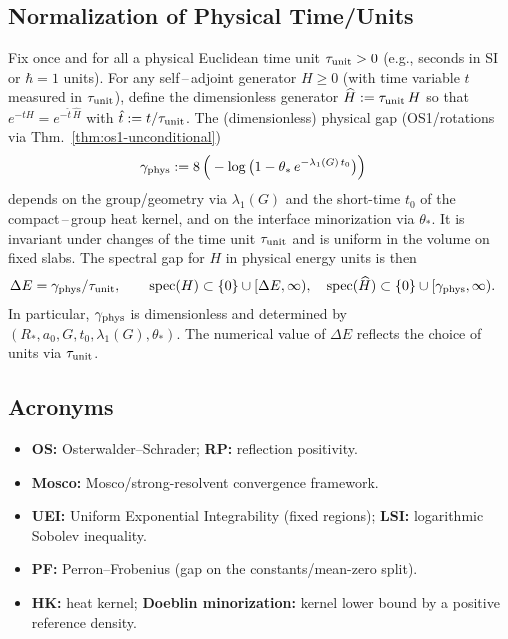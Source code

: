 \documentclass[11pt]{amsart}
\theoremstyle{plain}
\theoremstyle{definition}
\theoremstyle{remark}
\newcommand{\spec}{\operatorname{spec}}
\begin{document}
\subsection*{Normalization of Physical Time/Units}
Fix once and for all a physical Euclidean time unit $\tau_{\rm unit}>0$ (e.g., seconds in SI or $\hbar=1$ units). For any self\,–\,adjoint generator $H\ge 0$ (with time variable $t$ measured in $\tau_{\rm unit}$), define the dimensionless generator $\widehat H:=\tau_{\rm unit}\,H$ so that $e^{-t H}=e^{-\hat t\,\widehat H}$ with $\hat t:=t/\tau_{\rm unit}$. The (dimensionless) physical gap (OS1/rotations via Thm.~\ref{thm:os1-unconditional})
\begin{align}
  \gamma_{\rm phys} &:= 8\,\Big(-\log\big(1-\theta_*\, e^{-\lambda_1(G)\,t_0}\big)\Big)
\end{align}
depends on the group/geometry via $\lambda_1(G)$ and the short-time $t_0$ of the compact\,–\,group heat kernel, and on the interface minorization via $\theta_*$. It is invariant under changes of the time unit $\tau_{\rm unit}$ and is uniform in the volume on fixed slabs. The spectral gap for $H$ in physical energy units is then
\begin{align}
  \Delta E &= \gamma_{\rm phys}/\tau_{\rm unit}, \qquad \spec(H)\subset\{0\}\cup[\Delta E,\infty), \quad \spec(\widehat H)\subset\{0\}\cup[\gamma_{\rm phys},\infty).
\end{align}
In particular, $\gamma_{\rm phys}$ is dimensionless and determined by $(R_*,a_0,G,t_0,\lambda_1(G),\theta_*)$. The numerical value of $\Delta E$ reflects the choice of units via $\tau_{\rm unit}$.

\subsection*{Acronyms}
\begin{itemize}[leftmargin=2em, itemsep=4pt]
  \item \textbf{OS:} Osterwalder--Schrader; \textbf{RP:} reflection positivity.
  \item \textbf{Mosco:} Mosco/strong-resolvent convergence framework.
  \item \textbf{UEI:} Uniform Exponential Integrability (fixed regions); \textbf{LSI:} logarithmic Sobolev inequality.
  \item \textbf{PF:} Perron--Frobenius (gap on the constants/mean-zero split).
  \item \textbf{HK:} heat kernel; \textbf{Doeblin minorization:} kernel lower bound by a positive reference density.
\end{itemize}
\end{document}
